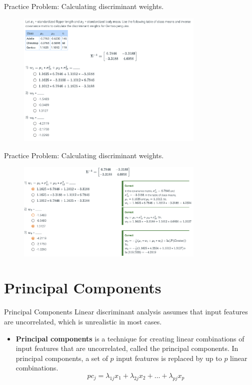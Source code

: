 \documentclass[10pt,dvipsnames]{beamer}
\begin{document}
\begin{frame}{Practice Problem: Calculating discriminant weights.}
	\begin{figure}[ht]
		\centering
		\includegraphics[width=0.8\textwidth]{imgs/df_11.png}
	\end{figure}
\end{frame}

\begin{frame}{Practice Problem: Calculating discriminant weights.}
	\begin{figure}[ht]
		\centering
		\includegraphics[width=0.8\textwidth]{imgs/df_12.png}
	\end{figure}
\end{frame}

\section{Principal Components}

\begin{frame}{Principal Components}
	Linear discriminant analysis assumes that input features are uncorrelated, which is unrealistic in most cases.
	\begin{itemize}
		\item \textbf{Principal components} is a technique for creating linear combinations of input features that are uncorrelated, called the principal components.
		      In principal components, a set of \(p\) input features is replaced by up to \(p\) linear combinations.
		      $$
			      p c_{j}=\lambda_{1 j} x_{1}+\lambda_{2 j} x_{2}+\ldots+\lambda_{p j} x_{p}
		      $$
	\end{itemize}
\end{frame}
\end{document}
